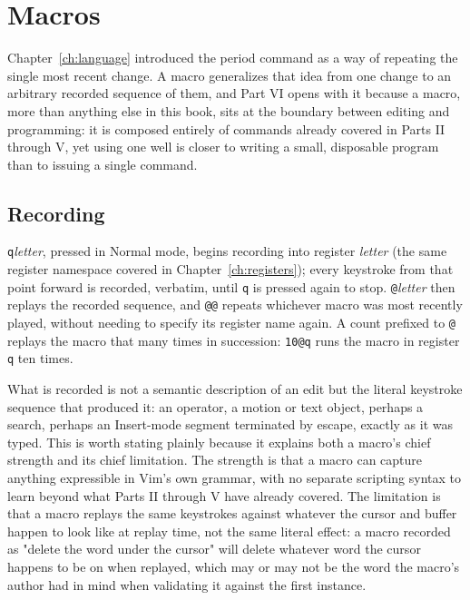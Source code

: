 \chapter{Macros}
\label{ch:macros}

Chapter~\ref{ch:language} introduced the period command as a way of repeating the single most recent change. A macro generalizes that idea from one change to an arbitrary recorded sequence of them, and Part VI opens with it because a macro, more than anything else in this book, sits at the boundary between editing and programming: it is composed entirely of commands already covered in Parts II through V, yet using one well is closer to writing a small, disposable program than to issuing a single command.

\section{Recording}

\texttt{q}\textit{letter}, pressed in Normal mode, begins recording into register \textit{letter} (the same register namespace covered in Chapter~\ref{ch:registers}); every keystroke from that point forward is recorded, verbatim, until \texttt{q} is pressed again to stop. \texttt{@}\textit{letter} then replays the recorded sequence, and \texttt{@@} repeats whichever macro was most recently played, without needing to specify its register name again. A count prefixed to \texttt{@} replays the macro that many times in succession: \texttt{10@q} runs the macro in register \texttt{q} ten times.

What is recorded is not a semantic description of an edit but the literal keystroke sequence that produced it: an operator, a motion or text object, perhaps a search, perhaps an Insert-mode segment terminated by escape, exactly as it was typed. This is worth stating plainly because it explains both a macro's chief strength and its chief limitation. The strength is that a macro can capture anything expressible in Vim's own grammar, with no separate scripting syntax to learn beyond what Parts II through V have already covered. The limitation is that a macro replays the same keystrokes against whatever the cursor and buffer happen to look like at replay time, not the same literal effect: a macro recorded as "delete the word under the cursor" will delete whatever word the cursor happens to be on when replayed, which may or may not be the word the macro's author had in mind when validating it against the first instance.

